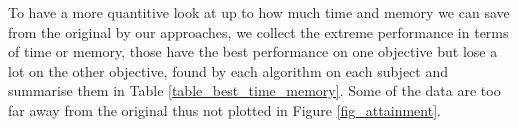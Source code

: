To have a more quantitive look at up to how much time and memory we can save from the original by our approaches, we collect the extreme performance in terms of time or memory, those have the best performance on one objective but lose a lot on the other objective, found by each algorithm on each subject and summarise them in Table \ref{table_best_time_memory}. Some of the data are too far away from the original thus not plotted in Figure \ref{fig_attainment}. 


\begin{table*}[htbp]
\centering
\caption{Maximum reduction on time and memory for each algorithm and each subject}
\label{table_best_time_memory}
\end{table*}
